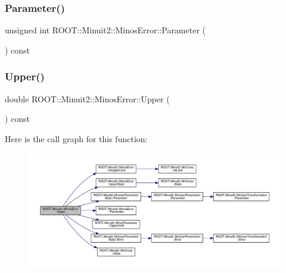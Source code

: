 \subsubsection{\texorpdfstring{Parameter()}{Parameter()}\hspace{0.1cm}{\footnotesize\ttfamily [2/2]}}
{\footnotesize\ttfamily unsigned int R\+O\+O\+T\+::\+Minuit2\+::\+Minos\+Error\+::\+Parameter (\begin{DoxyParamCaption}{ }\end{DoxyParamCaption}) const\hspace{0.3cm}{\ttfamily [inline]}}

\mbox{\label{classROOT_1_1Minuit2_1_1MinosError_a0223fde13608aadee1f15b51d15b2bf6}} 
\subsubsection{\texorpdfstring{Upper()}{Upper()}\hspace{0.1cm}{\footnotesize\ttfamily [1/2]}}
{\footnotesize\ttfamily double R\+O\+O\+T\+::\+Minuit2\+::\+Minos\+Error\+::\+Upper (\begin{DoxyParamCaption}{ }\end{DoxyParamCaption}) const\hspace{0.3cm}{\ttfamily [inline]}}

Here is the call graph for this function\+:
\nopagebreak
\begin{figure}[H]
\begin{center}
\leavevmode
\includegraphics[width=350pt]{d2/dd1/classROOT_1_1Minuit2_1_1MinosError_a0223fde13608aadee1f15b51d15b2bf6_cgraph}
\end{center}
\end{figure}
\mbox{\label{classROOT_1_1Minuit2_1_1MinosError_a0223fde13608aadee1f15b51d15b2bf6}} 
